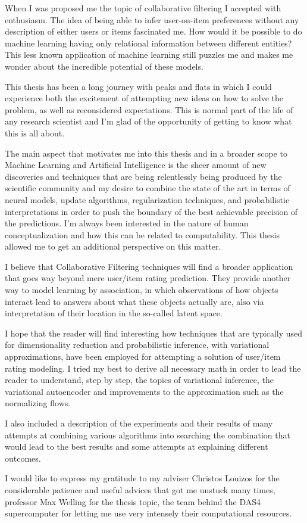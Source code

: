 
When I was proposed me the topic
of collaborative filtering
I accepted with enthusiasm.
The idea of being able to infer user-on-item preferences
without any description of either users
or items fascinated me. How would it be
possible to do machine learning
having only relational information between different
entities? This less known application of machine learning still puzzles me and makes me
wonder about the incredible potential of these models.

This thesis has been a long journey with peaks and flats in which I could
experience both the excitement of attempting new 
ideas on how to solve the problem, as well as reconsidered expectations.
This is normal part of the life of any research scientist
and I'm glad of the opportunity of getting to know what this is all about.

The main aspect that motivates me into this thesis and in a broader scope to
Machine Learning and Artificial Intelligence is the sheer amount of new discoveries and
techniques that are being relentlessly being produced by the scientific community
and my desire to combine the state of the art in terms of neural models, 
update algorithms,
regularization techniques,
and probabilistic interpretations in order to push the boundary
of the best achievable precision of the predictions.
I'm always been interested in the nature of human conceptualization
and how this can be related to computability. This thesis
allowed me to get an additional perspective on this matter.

I believe that Collaborative Filtering techniques will find a broader application
that goes way beyond mere user/item rating prediction. They provide another way
to model learning by association, in which observations of how objects interact
lead to answers about what these objects actually are, also via interpretation
of their location in the so-called latent space.

I hope that the reader will find interesting how techniques that are typically
used for dimensionality reduction and probabilistic inference, with variational
approximations, have been employed for attempting a solution of
user/item rating modeling. I tried my best to derive all necessary math
in order to lead the reader to understand, step by step, the topics of
variational inference, the variational autoencoder and improvements to
the approximation such as the normalizing flows.

I also included a description of the experiments and their results of
many attempts at combining various algorithms
into searching
the combination that would lead to the best results
and some attempts at explaining different outcomes.


I would like to express my gratitude to my adviser 
Christos Louizos for the considerable patience and
useful advices that got me unstuck many times, 
professor Max Welling for the thesis topic, the team behind the DAS4
supercomputer
\cite{das} for letting me use very intensely their computational resources.


